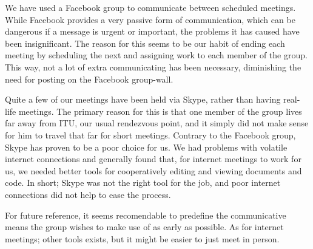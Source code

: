 We have used a Facebook group to communicate between scheduled meetings. While Facebook provides a very passive form of communication, which can be dangerous if a message is urgent or important, the problems it has caused 
have been insignificant. The reason for this seems to be our habit of ending each meeting by scheduling the next and assigning work to each member of the group. This way, not a lot of extra communicating has been necessary, diminishing the need for posting on the Facebook group-wall.

Quite a few of our meetings have been held via Skype, rather than having real-life meetings. The primary reason for this is that one member of the group lives far away from ITU, our usual rendezvous point, and it simply did not make sense for him to travel that far for short meetings.
Contrary to the Facebook group, Skype has proven to be a poor choice for us. We had problems with volatile internet connections and generally found that, for internet meetings to work for us, we needed better tools for cooperatively editing and viewing documents and code. In short; Skype was not the right tool for the job, and poor internet connections did not help to ease the process.

For future reference, it seems recomendable to predefine the communicative means the group wishes to make use of as early as possible. As for internet meetings; other tools exists, but it might be easier to just meet in person.
